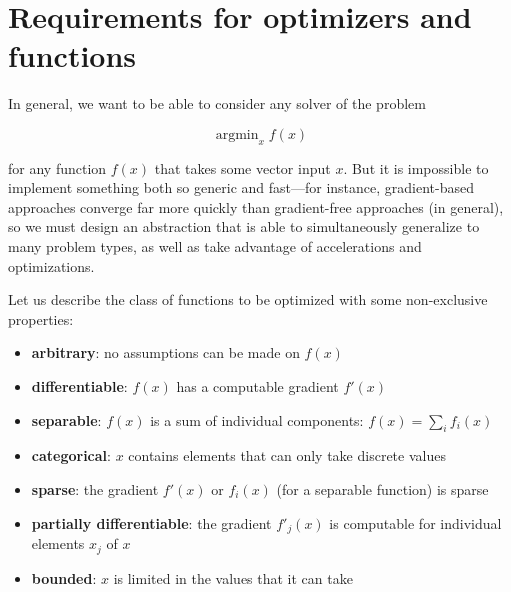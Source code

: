 \documentclass{article}
\begin{document}
\vspace*{-0.3em}
\section{Requirements for optimizers and functions}
\vspace*{-0.2em}

In general, we want to be able to consider any solver of the problem

\vspace*{-0.5em}
\begin{equation}
\operatorname{argmin}_{x} f(x)
\end{equation}
\vspace*{-1.3em}

\noindent for any function $f(x)$ that takes some vector input $x$.  But it
is impossible to implement something both so generic and fast---for instance,
gradient-based approaches converge far more quickly than gradient-free
approaches (in general), so we must design an abstraction that is able to
simultaneously generalize to many problem types, as well as take advantage of
accelerations and optimizations.

Let us describe the class of functions to be optimized with some non-exclusive
properties:

\vspace*{-0.4em}
\begin{itemize} \itemsep -1pt
  \item {\bf arbitrary}: no assumptions can be made on $f(x)$
  \item {\bf differentiable}: $f(x)$ has a computable gradient $f'(x)$
  \item {\bf separable}: $f(x)$ is a sum of individual components: $f(x) =
\sum_{i} f_i(x)$
  \item {\bf categorical}: $x$ contains elements that can only take discrete
values
  \item {\bf sparse}: the gradient $f'(x)$ or $f_i(x)$ (for a separable
function) is sparse
  \item {\bf partially differentiable}: the gradient $f'_j(x)$ is computable for
individual elements $x_j$ of $x$
  \item {\bf bounded}: $x$ is limited in the values that it can take
\end{itemize}
\vspace*{-0.4em}
\end{document}
